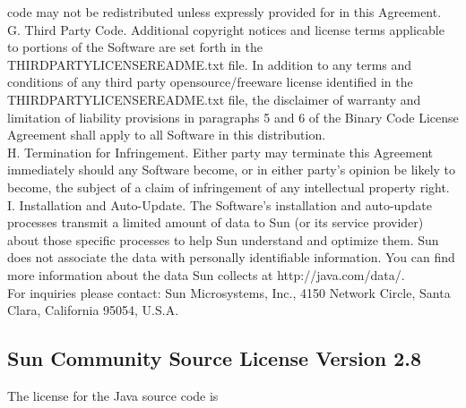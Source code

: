 {code may not be redistributed unless expressly provided for in this
Agreement.
\\[4pt]
G. Third Party Code. Additional copyright notices and license terms
applicable to portions of the Software are set forth in the
THIRDPARTYLICENSEREADME.txt file. In addition to any terms and
conditions of any third party opensource/freeware license identified
in the THIRDPARTYLICENSEREADME.txt file, the disclaimer of warranty
and limitation of liability provisions in paragraphs 5 and 6 of the
Binary Code License Agreement shall apply to all Software in this
distribution.
\\[4pt]
H. Termination for Infringement. Either party may terminate this
Agreement immediately should any Software become, or in either party's
opinion be likely to become, the subject of a claim of infringement of
any intellectual property right.
\\[4pt]
I. Installation and Auto-Update.  The Software's installation and
auto-update processes transmit a limited amount of data to Sun (or its
service provider) about those specific processes to help Sun
understand and optimize them.  Sun does not associate the data with
personally identifiable information.  You can find more information
about the data Sun collects at http://java.com/data/.
\\[4pt]
For inquiries please contact: Sun Microsystems, Inc., 4150 Network
Circle, Santa Clara, California 95054, U.S.A.
}

\subsection{Sun Community Source License Version 2.8}

\setlength{\baselineskip}{\oldbaselineskip}
\noindent
The license for the Java source code is


